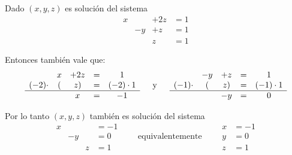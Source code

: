\documentclass[handout]{beamer} %
\renewcommand{\_}[1]{_{\left( #1 \right)}}
\renewcommand{\^}[1]{^{\left( #1 \right)}}
\begin{document}
\begin{frame}
Dado $(x,y,z)$ es solución del sistema
\begin{equation*}
\begin{matrix}
x &  & +2z & = 1 \\
& -y & +z & =1 \\
&    & z & = 1
\end{matrix}
\end{equation*}

 
Entonces también vale que: 
\begin{equation*}
\begin{matrix}
 &x & +2z & = & 1 \\
(-2)\cdot&(&z) & = &(-2)\cdot1 \\
\hline
&   & x & = & -1    
\end{matrix}
\qquad\mbox{y}\qquad
\begin{matrix}
&-y & +z & = & 1 \\
(-1)\cdot&(&z) & = &(-1)\cdot1 \\
\hline
&   & -y & = & 0
\end{matrix}
\end{equation*}
\pause
 
Por lo tanto $(x,y,z)$ también es solución del sistema
\begin{equation*}
\begin{matrix}
x &  &  & = -1 \\
& -y &  & =0 \\
&    & z & = 1
\end{matrix}
\qquad\mbox{equivalentemente}\qquad
\begin{matrix}
x & = -1 \\
y & =0 \\
z & = 1
\end{matrix}
\end{equation*}
\end{frame}
\end{document}
